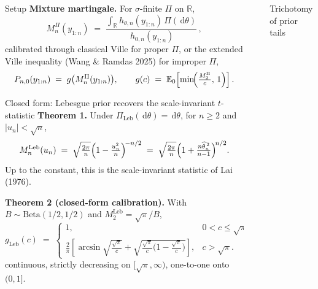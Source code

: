 \documentclass[final]{beamer}
\newcommand{\E}{\mathbb{E}}
\newcommand{\dd}{\,\mathrm{d}}
\newcommand{\Leb}{\mathrm{Leb}}
\newcommand{\thetahat}{\widehat{\theta}_n}
\newlength{\sepwidth}
\newlength{\colwidth}
\newcommand{\separatorcolumn}{\begin{column}{\sepwidth}\end{column}}
\begin{document}
\begin{frame}[t]
\begin{columns}[t]
\begin{column}{\colwidth}
\begin{block}{Setup}
    \vspace{0.1cm}
    \textbf{Mixture martingale.} For $\sigma$-finite $\Pi$ on $\mathbb R$,
    \[
      M_n^{\Pi}(y_{1:n}) \;=\; \frac{\int_{\mathbb R} h_{\theta,n}(y_{1:n})\,\Pi(\dd\theta)}{\,h_{0,n}(y_{1:n})}\,,
    \]
    calibrated through classical Ville for proper $\Pi$, or the \alert{extended Ville inequality} (Wang \& Ramdas 2025) for improper $\Pi$,
    \[
      P_{n,0}(y_{1:n}) \;=\; g\bigl(M_n^{\Pi}(y_{1:n})\bigr), \qquad
      g(c) \;=\; \E_0\!\left[\min\!\Bigl(\tfrac{M_2^{\Pi}}{c},\,1\Bigr)\right].
    \]
  \end{block}

  \begin{block}{Closed form: Lebesgue prior recovers the scale-invariant \texorpdfstring{$t$}{t}-statistic}
    \textbf{Theorem 1.} Under $\Pi_{\Leb}(\dd\theta)=\dd\theta$, for $n\ge 2$ and $|u_n|<\sqrt n$,
    {\large
    \[
      M_n^{\Leb}(u_n) \;=\; \sqrt{\tfrac{2\pi}{n}}\Bigl(1-\tfrac{u_n^{2}}{n}\Bigr)^{\!-n/2} \;=\; \sqrt{\tfrac{2\pi}{n}}\Bigl(1+\tfrac{n\thetahat^{\,2}}{n-1}\Bigr)^{\!n/2}.
    \]}
    Up to the constant, this is the scale-invariant statistic of Lai (1976).

    \vspace{0.1cm}
    \textbf{Theorem 2 (closed-form calibration).} With $B\sim\mathrm{Beta}(1/2,1/2)$ and $M_2^{\Leb}=\sqrt\pi/B$,
    \[
      g_{\Leb}(c) \;=\; \begin{cases} 1, & 0<c\le\sqrt\pi,\\[2pt]
        \tfrac{2}{\pi}\!\left[\arcsin\!\sqrt{\tfrac{\sqrt\pi}{c}}+\sqrt{\tfrac{\sqrt\pi}{c}\bigl(1-\tfrac{\sqrt\pi}{c}\bigr)}\right], & c>\sqrt\pi.
      \end{cases}
    \]
    continuous, strictly decreasing on $[\sqrt\pi,\infty)$, one-to-one onto $(0,1]$.
  \end{block}

\end{column}

\separatorcolumn

\begin{column}{\colwidth}
  \begin{block}{Trichotomy of prior tails}



\end{block}
\end{column}
\end{columns}
\end{frame}
\end{document}
